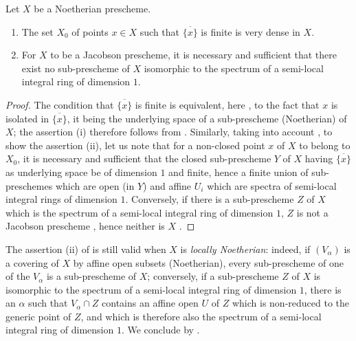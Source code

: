 \begin{proposition}[10.5.5]
\label{IV.10.5.5}
Let $X$ be a Noetherian prescheme.
\begin{enumerate}[label=(\roman*)]
  \item The set $X_0$ of points $x\in X$ such that $\overline{\{x\}}$ is finite is very dense in $X$.
  \item For $X$ to be a Jacobson prescheme, it is necessary and sufficient that there exist no sub-prescheme of $X$ isomorphic to the spectrum of a semi-local integral ring of dimension $1$.
\end{enumerate}
\end{proposition}

\begin{proof}
The condition that $\overline{\{x\}}$ is finite is equivalent, here , to the fact that $x$ is isolated in $\overline{\{x\}}$, it being the underlying space of a sub-prescheme (Noetherian) of $X$; the assertion (i) therefore follows from .
Similarly, taking into account , to show the assertion (ii), let us note that for a non-closed point $x$ of $X$ to belong to $X_0$, it is necessary and sufficient that the closed sub-prescheme $Y$ of $X$ having $\overline{\{x\}}$ as underlying space be of dimension $1$ and finite, hence a finite union of sub-preschemes which are open (in $Y$) and affine $U_i$ which are spectra of semi-local integral rings of dimension $1$.
Conversely, if there is a sub-prescheme $Z$ of $X$ which is the spectrum of a semi-local integral ring of dimension $1$, $Z$ is not a Jacobson prescheme , hence neither is $X$ .
\end{proof}


\begin{remark}[10.5.6]
\label{IV.10.5.6}
The assertion (ii) of  is still valid when $X$ is \emph{locally Noetherian}: indeed, if $(V_\alpha)$ is a covering of $X$ by affine open subsets (Noetherian), every sub-prescheme of one of the $V_\alpha$ is a sub-prescheme of $X$; conversely, if a sub-prescheme $Z$ of $X$ is isomorphic to the spectrum of a semi-local integral ring of dimension $1$, there is an $\alpha$ such that $V_\alpha\cap Z$ contains an affine open $U$ of $Z$ which is non-reduced to the generic point of $Z$, and which is therefore also the spectrum of a semi-local integral ring of dimension $1$.
We conclude by .
\end{remark}

